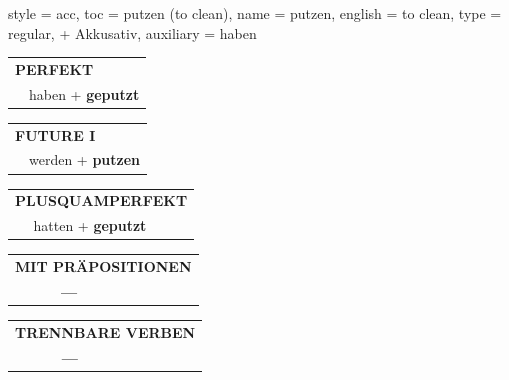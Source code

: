 \begin{verbentry}{
  style = {acc},
  toc = {putzen (to clean)},
  name = {putzen},
  english = {to clean},
  type = {regular, + Akkusativ},
  auxiliary = {haben}
}
    \vspace{10pt}

 \begin{tabular}{rl}
     \multicolumn{2}{l}{\textbf{PERFEKT}}\\
 &  haben + \textbf{geputzt}\\
  \end{tabular}
\hfill
   \begin{tabular}{rl}
   
    \multicolumn{2}{l}{\textbf{FUTURE I} }\\
  &  werden + \textbf{putzen}\\
 
  \end{tabular}
\hfill
   \begin{tabular}{rl}
      \multicolumn{2}{l}{\textbf{PLUSQUAMPERFEKT}}\\
   & hatten + \textbf{geputzt}\\
  \end{tabular}
  
  
\vspace{10pt}

\begin{tabular}{lll}
\multicolumn{3}{l}{\textbf{MIT PRÄPOSITIONEN}}\\
& \textbf{---} & \\
\end{tabular}
\hfill
\begin{tabular}{lll}
\multicolumn{3}{l}{\textbf{TRENNBARE VERBEN}}\\
& \textbf{---} & \\
\end{tabular}
\vspace{-5pt}
\end{verbentry}
